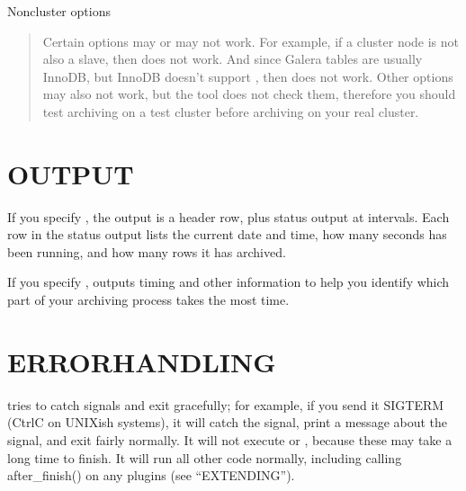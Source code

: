 \documentclass[letterpaper,10pt,english]{sphinxmanual}
\begin{document}
Non\sphinxhyphen{}cluster options
\begin{quote}

Certain options may or may not work.  For example, if a cluster node
is not also a slave, then {\hyperref[\detokenize{mariadb-archiver:cmdoption-mariadb-archiver-check-slave-lag}]{}} does not work.  And since Galera
tables are usually InnoDB, but InnoDB doesn’t support , then
{\hyperref[\detokenize{mariadb-archiver:cmdoption-mariadb-archiver-delayed-insert}]{}} does not work.  Other options may also not work, but
the tool does not check them, therefore you should test archiving on a test
cluster before archiving on your real cluster.
\end{quote}


\section{OUTPUT}
\label{\detokenize{mariadb-archiver:output}}
If you specify {\hyperref[\detokenize{mariadb-archiver:cmdoption-mariadb-archiver-progress}]{}}, the output is a header row, plus status output
at intervals.  Each row in the status output lists the current date and time,
how many seconds  has been running, and how many rows it has
archived.

If you specify {\hyperref[\detokenize{mariadb-archiver:cmdoption-mariadb-archiver-statistics}]{}},  outputs timing and other
information to help you identify which part of your archiving process takes the
most time.


\section{ERROR\sphinxhyphen{}HANDLING}
\label{\detokenize{mariadb-archiver:error-handling}}
 tries to catch signals and exit gracefully; for example, if you
send it SIGTERM (Ctrl\sphinxhyphen{}C on UNIX\sphinxhyphen{}ish systems), it will catch the signal, print a
message about the signal, and exit fairly normally.  It will not execute
{\hyperref[\detokenize{mariadb-archiver:cmdoption-mariadb-archiver-analyze}]{}} or {\hyperref[\detokenize{mariadb-archiver:cmdoption-mariadb-archiver-optimize}]{}}, because these may take a long time to finish.
It will run all other code normally, including calling after\_finish() on any
plugins (see “EXTENDING”).
\end{document}
